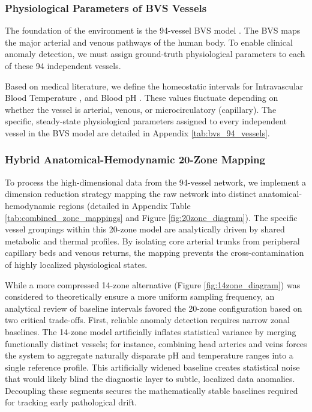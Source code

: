 \documentclass[sigconf]{acmart}
\begin{document}
\subsubsection{Physiological Parameters of BVS Vessels}
The foundation of the environment is the 94-vessel BVS model \cite{geyer2018bloodvoyagers, lopez2023toward}. The BVS maps the major arterial and venous pathways of the human body. To enable clinical anomaly detection, we must assign ground-truth physiological parameters to each of these 94 independent vessels. 

Based on medical literature, we define the homeostatic intervals for Intravascular Blood Temperature \cite{brengelmann2003body, romanovsky2014skin}, and Blood pH \cite{kellum2000critical, siggaard1963scand}. These values fluctuate depending on whether the vessel is arterial, venous, or microcirculatory (capillary). The specific, steady-state physiological parameters assigned to every independent vessel in the BVS model are detailed in Appendix \ref{tab:bvs_94_vessels}.

\subsubsection{Hybrid Anatomical-Hemodynamic 20-Zone Mapping}
To process the high-dimensional data from the 94-vessel network, we implement a dimension reduction strategy mapping the raw network into distinct anatomical-hemodynamic regions (detailed in Appendix Table \ref{tab:combined_zone_mappings} and Figure \ref{fig:20zone_diagram}). The specific vessel groupings within this 20-zone model are analytically driven by shared metabolic and thermal profiles. By isolating core arterial trunks from peripheral capillary beds and venous returns, the mapping prevents the cross-contamination of highly localized physiological states. 

While a more compressed 14-zone alternative (Figure \ref{fig:14zone_diagram}) was considered to theoretically ensure a more uniform sampling frequency, an analytical review of baseline intervals favored the 20-zone configuration based on two critical trade-offs. First, reliable anomaly detection requires narrow zonal baselines. The 14-zone model artificially inflates statistical variance by merging functionally distinct vessels; for instance, combining head arteries and veins forces the system to aggregate naturally disparate pH and temperature ranges into a single reference profile. This artificially widened baseline creates statistical noise that would likely blind the diagnostic layer to subtle, localized data anomalies. Decoupling these segments secures the mathematically stable baselines required for tracking early pathological drift.
\end{document}
